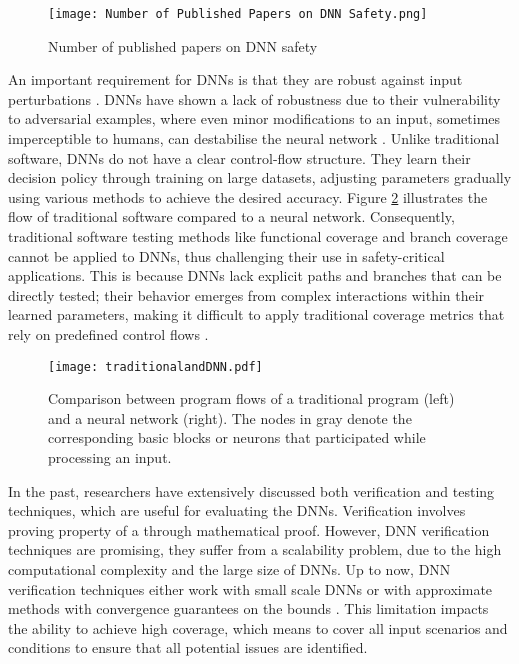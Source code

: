 \begin{figure}[tb]
  \centering
  \texttt{[image: Number of Published Papers on DNN Safety.png]}
  \caption{Number of published papers on DNN safety }
  \label{fig:publish}
\end{figure}

An important requirement for DNNs is that they are robust against input perturbations \cite{HuangX}. 
DNNs have shown a lack of robustness due to their vulnerability to adversarial examples, where even minor modifications to an input, sometimes imperceptible to humans, can destabilise the neural network \cite{Goodfellow,Carlini}. Unlike traditional software, DNNs do not have a clear control-flow structure. They learn their decision policy through training on large datasets, adjusting parameters gradually using various methods to achieve the desired accuracy. Figure \ref{fig:Comparison} illustrates the flow of traditional software compared to a neural network. Consequently, traditional software testing methods like functional coverage and branch coverage  cannot be applied to DNNs, thus challenging their use in safety-critical applications. This is because DNNs lack explicit paths and branches that can be directly tested; their behavior emerges from complex interactions within their learned parameters, making it difficult to apply traditional coverage metrics that rely on predefined control flows \cite{Sekhon}.

\begin{figure}
  \centering
  \texttt{[image: traditionalandDNN.pdf]}
  \caption{Comparison between program flows of a traditional program (left) and a neural network (right). The nodes in gray denote the corresponding basic blocks or neurons that participated while processing an input.}
  \label{fig:Comparison}
\end{figure}

 In the past, researchers have extensively discussed both verification and testing techniques, which are useful for evaluating the DNNs. Verification involves proving  property  of a  through mathematical proof.  However, DNN verification techniques are promising, they suffer from a scalability problem, due to the high computational complexity and the large size of DNNs. Up to now, DNN verification techniques either work with small scale DNNs or with approximate methods with convergence guarantees on the bounds \cite{HuangX}. This limitation impacts the ability to achieve high coverage, which means to cover all input scenarios and conditions to ensure that all potential issues are identified.

